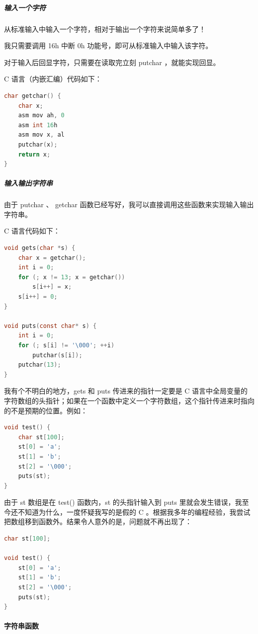 \documentclass{article}
\begin{document}
\subparagraph{输入一个字符}

从标准输入中输入一个字符，相对于输出一个字符来说简单多了！

我只需要调用 16h 中断 0h 功能号，即可从标准输入中输入该字符。

对于输入后回显字符，只需要在读取完立刻 putchar ，就能实现回显。

C 语言（内嵌汇编）代码如下：

\begin{lstlisting}[language=C]
char getchar() {
	char x;
	asm mov ah, 0
	asm int 16h
	asm mov x, al
	putchar(x);
	return x;
}
\end{lstlisting}

\subparagraph{输入输出字符串}

由于 putchar 、 getchar 函数已经写好，我可以直接调用这些函数来实现输入输出字符串。

C 语言代码如下：

\begin{lstlisting}[language=C]
void gets(char *s) {
	char x = getchar();
	int i = 0;
	for (; x != 13; x = getchar())
		s[i++] = x;
	s[i++] = 0;
}

void puts(const char* s) {
	int i = 0;
	for (; s[i] != '\000'; ++i)
		putchar(s[i]);
	putchar(13);
}
\end{lstlisting}

我有个不明白的地方，gets 和 puts 传进来的指针一定要是 C 语言中全局变量的字符数组的头指针；如果在一个函数中定义一个字符数组，这个指针传进来时指向的不是预期的位置。例如：

\begin{lstlisting}[language=C]
void test() {
	char st[100];
	st[0] = 'a';
	st[1] = 'b';
	st[2] = '\000';
	puts(st);
}
\end{lstlisting}

由于 st 数组是在 test() 函数内，st 的头指针输入到 puts 里就会发生错误，我至今还不知道为什么，一度怀疑我写的是假的 C 。根据我多年的编程经验，我尝试把数组移到函数外。结果令人意外的是，问题就不再出现了：

\begin{lstlisting}[language=C]
char st[100];

void test() {
	st[0] = 'a';
	st[1] = 'b';
	st[2] = '\000';
	puts(st);
}
\end{lstlisting}

\paragraph{字符串函数}
\end{document}

